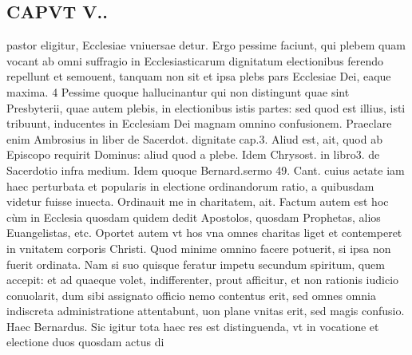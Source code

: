 \documentclass{article}
\begin{document}
\begin{pages}
\section*{CAPVT  V.. }
\marginpar{[ p.349 ]}\pstart pastor eligitur, Ecclesiae vniuersae detur.  \pend\pstart Ergo pessime faciunt, qui plebem quam vocant ab omni suffragio in Ecclesiasticarum dignitatum electionibus ferendo repellunt et semouent, tanquam non sit et ipsa plebs pars Ecclesiae Dei, eaque maxima. 4  \pend\pstart Pessime quoque hallucinantur qui non distingunt quae sint Presbyterii, quae autem plebis, in electionibus istis partes: sed quod est illius, isti tribuunt, inducentes in Ecclesiam Dei magnam omnino confusionem. Praeclare enim Ambrosius in liber  de Sacerdot. dignitate cap.3. Aliud est, ait, quod ab Episcopo requirit Dominus: aliud quod a plebe. Idem Chrysost. in libro3. de Sacerdotio infra medium. Idem quoque Bernard.sermo 49. Cant. cuius aetate iam haec perturbata et popularis in electione ordinandorum ratio, a quibusdam videtur fuisse inuecta. Ordinauit me in charitatem, ait. Factum autem est hoc cùm in Ecclesia quosdam quidem dedit Apostolos, quosdam Prophetas, alios Euangelistas, etc. Oportet autem vt hos vna omnes charitas liget et contemperet in vnitatem corporis Christi. Quod minime omnino facere potuerit, si ipsa non fuerit ordinata. Nam si suo quisque feratur impetu secundum spiritum, quem accepit: et ad quaeque volet, indifferenter, prout afficitur, et non rationis iudicio conuolarit, dum sibi assignato officio nemo contentus erit, sed omnes omnia indiscreta administratione attentabunt, uon plane vnitas erit, sed magis confusio. Haec Bernardus.  \pend\pstart Sic igitur tota haec res est distinguenda, vt in vocatione et electione duos quosdam actus di\pend

\end{pages}
\end{document}
